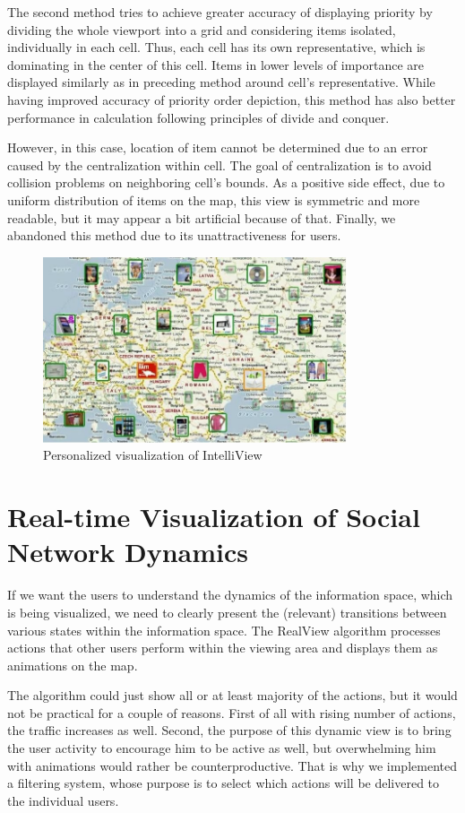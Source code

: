 \documentclass[6pt]{article}
\begin{document}
The second method tries to achieve greater accuracy of displaying priority by dividing the whole viewport into a grid and considering items isolated, individually in each cell. Thus, each cell has its own representative, which is dominating in the center of this cell. Items in lower levels of importance are displayed similarly as in preceding method around cell's representative. While having improved accuracy of priority order depiction, this method has also better performance in calculation following principles of divide and conquer.

However, in this case, location of item cannot be determined due to an error caused by the centralization within cell. The goal of centralization is to avoid collision
problems on neighboring cell's bounds. As a positive side effect, due to uniform distribution of items on the map, this view is symmetric and more readable, but it may appear a bit artificial because of that. Finally, we abandoned this method due to its unattractiveness for users.

\begin{figure}[h]
\centering
\includegraphics[width=0.8\textwidth]{images/fig3.jpg}
\caption{Personalized visualization of IntelliView}
\end{figure}

\section{Real-time Visualization of Social Network Dynamics}
\label{4}
If we want the users to understand the dynamics of the information space, which is being visualized, we need to clearly present the (relevant) transitions between various states within the information space. The RealView algorithm processes actions that other users perform within the viewing area and displays them as animations on the map.

The algorithm could just show all or at least majority of the actions, but it would not be practical for a couple of reasons. First of all with rising number of actions, the traffic increases as well. Second, the purpose of this dynamic view is to bring the user activity to encourage him to be active as well, but overwhelming him with animations would rather be counterproductive. That is why we implemented a filtering system, whose purpose is to select which actions will be delivered to the individual users.
\end{document}
